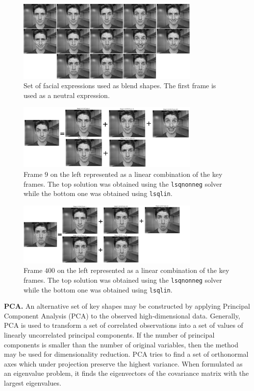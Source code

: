\documentclass[11pt]{report}
\begin{document}
\begin{figure}[htbp!]
\centering
\includegraphics[width=0.8\textwidth]{img/weights/2D/basis/all.png}
	\caption{Set of facial expressions used as blend shapes. The first frame is used as a neutral expression.}
	\label{fig:2Dblends}
\end{figure}
\begin{figure}[htbp!]
\centering
\includegraphics[width=0.8\textwidth]{img/weights/2D/frame_10/all.png}
	\caption{Frame $9$ on the left represented as a linear combination of the key frames. The top solution was obtained using the \texttt{lsqnonneg} solver while the bottom one was obtained using \texttt{lsqlin}.}
	\label{fig:frame10}
\end{figure}

\begin{figure}[htbp!]
\centering
\includegraphics[width=0.8\textwidth]{img/weights/2D/frame_400/all.png}
	\caption{Frame $400$ on the left represented as a linear combination of the key frames. The top solution was obtained using the \texttt{lsqnonneg} solver while the bottom one was obtained using \texttt{lsqlin}.}
	\label{fig:frame400}
\end{figure}

\textbf{PCA.} An alternative set of key shapes may be constructed by applying Principal Component Analysis (PCA) to the observed high-dimensional data. Generally, PCA is used to transform a set of correlated observations into a set of values of linearly uncorrelated principal components. If the number of principal components is smaller than the number of original variables, then the method may be used for dimensionality reduction. PCA tries to find a set of orthonormal axes which under projection preserve the highest variance. When formulated as an eigenvalue problem, it finds the eigenvectors of the covariance matrix with the largest eigenvalues. 
\end{document}
